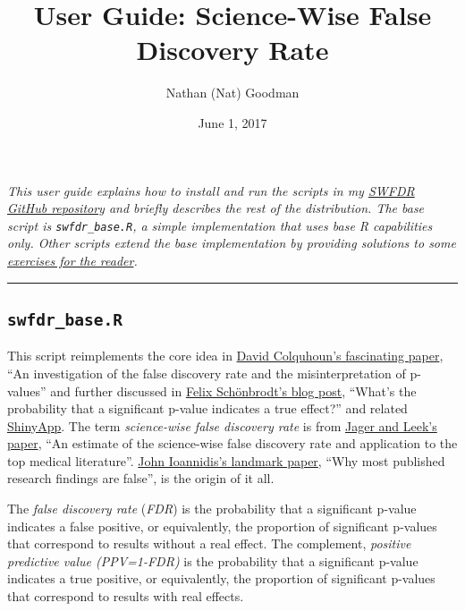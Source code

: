 \documentclass[]{article}
\title{User Guide: Science-Wise False Discovery Rate}
\author{Nathan (Nat) Goodman}
\date{June 1, 2017}
\begin{document}
\maketitle

{
\hypersetup{linkcolor=black}
\setcounter{tocdepth}{3}
\tableofcontents
}
\emph{This user guide explains how to install and run the scripts in my
\href{https://github.com/natgoodman/SWFDR}{SWFDR GitHub repository} and
briefly describes the rest of the distribution. The base script is
\texttt{swfdr\_base.R}, a simple implementation that uses base R
capabilities only. Other scripts extend the base implementation by
providing solutions to some \href{exercises.pdf}{exercises for the
reader}.}

\begin{center}\rule{0.5\linewidth}{\linethickness}\end{center}

\subsection{\texorpdfstring{\texttt{swfdr\_base.R}}{swfdr\_base.R}}\label{swfdr_base.r}

This script reimplements the core idea in
\href{http://rsos.royalsocietypublishing.org/content/1/3/140216}{David
Colquhoun's fascinating paper}, ``An investigation of the false
discovery rate and the misinterpretation of p-values'' and further
discussed in
\href{http://www.nicebread.de/whats-the-probability-that-a-significant-p-value-indicates-a-true-effect/}{Felix
Schönbrodt's blog post}, ``What's the probability that a significant
p-value indicates a true effect?'' and related
\href{http://shinyapps.org/apps/PPV/}{ShinyApp}. The term
\emph{science-wise false discovery rate} is from
\href{http://doi.org/10.1093/biostatistics/kxt007}{Jager and Leek's
paper}, ``An estimate of the science-wise false discovery rate and
application to the top medical literature''.
\href{http://dx.plos.org/10.1371/journal.pmed.0020124}{John Ioannidis's
landmark paper}, ``Why most published research findings are false'', is
the origin of it all.

The \emph{false discovery rate} (\emph{FDR}) is the probability that a
significant p-value indicates a false positive, or equivalently, the
proportion of significant p-values that correspond to results without a
real effect. The complement, \emph{positive predictive value
(PPV=1-FDR)} is the probability that a significant p-value indicates a
true positive, or equivalently, the proportion of significant p-values
that correspond to results with real effects.
\end{document}
